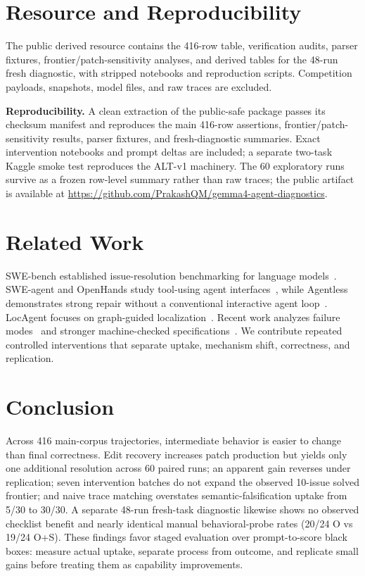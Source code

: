 \documentclass[10pt,twocolumn]{article}
\begin{document}
\section{Resource and Reproducibility}
The public derived resource contains the 416-row table, verification audits, parser fixtures, frontier/patch-sensitivity analyses, and derived tables for the 48-run fresh diagnostic, with stripped notebooks and reproduction scripts. Competition payloads, snapshots, model files, and raw traces are excluded.

\noindent\textbf{Reproducibility.} A clean extraction of the public-safe package passes its checksum manifest and reproduces the main 416-row assertions, frontier/patch-sensitivity results, parser fixtures, and fresh-diagnostic summaries. Exact intervention notebooks and prompt deltas are included; a separate two-task Kaggle smoke test reproduces the ALT-v1 machinery. The 60 exploratory runs survive as a frozen row-level summary rather than raw traces; the public artifact is available at \url{https://github.com/PrakashQM/gemma4-agent-diagnostics}.

\section{Related Work}
SWE-bench established issue-resolution benchmarking for language models~\cite{jimenez2024swebench}. SWE-agent and OpenHands study tool-using agent interfaces~\cite{yang2024sweagent,wang2024openhands}, while Agentless demonstrates strong repair without a conventional interactive agent loop~\cite{xia2024agentless}. LocAgent focuses on graph-guided localization~\cite{chen2025locagent}. Recent work analyzes failure modes~\cite{jiang2026failures} and stronger machine-checked specifications~\cite{ma2026sweproof}. We contribute repeated controlled interventions that separate uptake, mechanism shift, correctness, and replication.

\section{Conclusion}
Across 416 main-corpus trajectories, intermediate behavior is easier to change than final correctness. Edit recovery increases patch production but yields only one additional resolution across 60 paired runs; an apparent gain reverses under replication; seven intervention batches do not expand the observed 10-issue solved frontier; and naive trace matching overstates semantic-falsification uptake from 5/30 to 30/30. A separate 48-run fresh-task diagnostic likewise shows no observed checklist benefit and nearly identical manual behavioral-probe rates (20/24 O vs 19/24 O+S). These findings favor staged evaluation over prompt-to-score black boxes: measure actual uptake, separate process from outcome, and replicate small gains before treating them as capability improvements.
\end{document}
